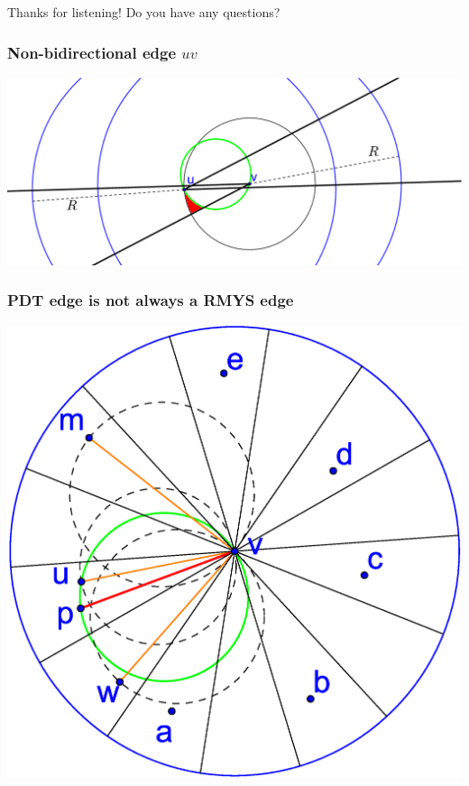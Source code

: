 \documentclass[compress]{beamer}
\begin{document}
\subsection{}
\begin{frame}
\center \Large Thanks for listening!
\center Do you have any questions?
\end{frame}

\begin{frame}
	\frametitle{Non-bidirectional edge $uv$}
	\center \includegraphics[width=1\linewidth]{RMYS_case_error_bidirectional.eps}
\end{frame}

\begin{frame}
	\frametitle{PDT edge is not always a RMYS edge}
	\center \includegraphics[width=0.7\linewidth]{RMYS_case_one_cone_empty.eps}
\end{frame}
\end{document}
